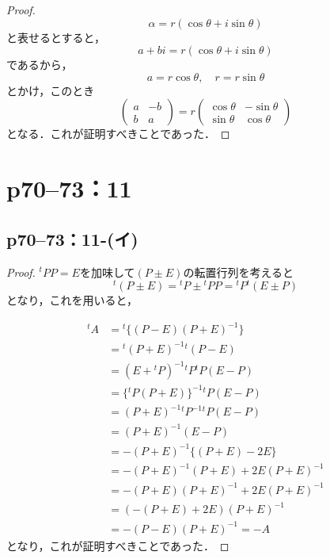 \documentclass[a4paper,10pt,fleqn]{ltjsarticle}
\begin{document}
\begin{tleftbar}
  \begin{proof}
    \[
      \alpha = r (\cos \theta + i \sin \theta)
    \]
    と表せるとすると，
    \[
      a+bi = r (\cos \theta + i \sin \theta )
    \]
    であるから，
    \[
      a= r \cos \theta , \quad r = r \sin \theta
    \]
    とかけ，このとき
    \[
      \begin{pmatrix} a & -b \\ b & a \end{pmatrix} = r \begin{pmatrix} \cos \theta & -\sin \theta \\ \sin \theta & \cos \theta \end{pmatrix}
    \]
    となる．これが証明すべきことであった．
  \end{proof}
\end{tleftbar}

\newpage

\section*{p70--73：11}

\subsection*{p70--73：11-(イ)}

\begin{tleftbar}
  \begin{proof}
    ${}^t PP =E$を加味して$(P \pm E)$の転置行列を考えると
    \[
      {}^t (P \pm E) = {}^t P \pm {}^t PP = {}^t P {}^t (E \pm P)
    \]
    となり，これを用いると，

    \begin{align*}
      {}^t A & ={}^t  \{ (P-E)(P+E)^{-1} \}            \\
             & = {}^t (P+E)^{-1} {}^t (P-E)            \\
             & = (E+{}^t P)^{-1} {}^t P {}^t P (E-P)   \\
             & = \{ {}^t P (P+E)  \}^{-1} {}^t P (E-P) \\
             & = (P+E)^{-1} {}^t P^{-1} {}^t P (E-P)   \\
             & = (P+E)^{-1} (E-P)                      \\
             & = -(P+E)^{-1} \{ (P+E)-2E \}            \\
             & = -(P+E)^{-1} (P+E) +2E (P+E)^{-1}      \\
             & = -(P+E) (P+E)^{-1} +2E (P+E)^{-1}      \\
             & = (-(P+E)+2E) (P+E)^{-1}                \\
             & = -(P-E) (P+E)^{-1} = -A
    \end{align*}
    となり，これが証明すべきことであった．
  \end{proof}
\end{tleftbar}
\end{document}

